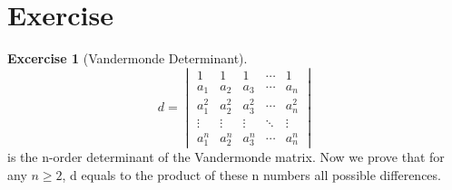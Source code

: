 \documentclass{article}
\theoremstyle{definition}
\newtheorem{exercise}{Excercise}[section]
\begin{document}
\section{Exercise}
\begin{exercise}[Vandermonde Determinant]
$$d=
\begin{vmatrix}
    1 & 1 & 1 & \cdots & 1\\
    a_{1} & a_{2} & a_{3} & \cdots & a_{n}\\
    a_{1}^{2} & a_{2}^{2} & a_{3}^{2} & \cdots & a_{n}^{2}\\
    \vdots & \vdots & \vdots & \ddots & \vdots\\
    a_{1}^{n} & a_{2}^{n} & a_{3}^{n} & \cdots & a_{n}^{n}
\end{vmatrix}$$
is the n-order determinant of the Vandermonde matrix.
Now we prove that for any $n \geq 2$, d equals to the product of 
these n numbers all possible differences.
\end{exercise}
\end{document}
